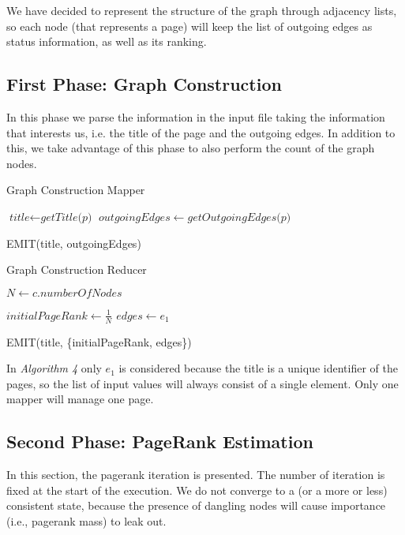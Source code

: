 \noindent We have decided to represent the structure of the graph through adjacency lists, so each node (that represents a page) will keep the list of outgoing edges as status information, as well as its ranking.

\subsection{First Phase: Graph Construction}
In this phase we parse the information in the input file taking the information that interests us, i.e. the title of the page and the outgoing edges. In addition to this, we take advantage of this phase to also perform the count of the graph nodes.

\begin{algorithm}[H]
	\caption{Graph Construction Mapper}\label{Mapper}
		\begin{algorithmic}[1]
					\State $\textit{title} \gets \textit{getTitle(p)}$
					\State $ outgoingEdges \gets \textit{getOutgoingEdges(p)}$
		
					\State EMIT(title, outgoingEdges)
			\EndProcedure
			
			
	\end{algorithmic}
\end{algorithm}

\begin{algorithm}[H]
	\caption{Graph Construction Reducer}\label{Reducer}
		\begin{algorithmic}[1]
				\State $N \gets c.numberOfNodes$
			\EndProcedure
		
					\State $\textit{initialPageRank} \gets \frac{1}{N} $
					\State $ \textit{edges} \gets e_1$
		
					\State EMIT(title, \{initialPageRank, edges\})
				
			\EndProcedure
		\end{algorithmic}
\end{algorithm}

\noindent In \textit{Algorithm 4} only $e_1$ is considered because the title is a unique identifier of the pages, so the list of input values will always consist of a single element. Only one mapper will manage one page.

\subsection{Second Phase: PageRank Estimation}
In this section, the pagerank iteration is presented.
\noindent The number of iteration is fixed at the start of the execution. We do not converge to a (or a more or less) consistent state, because the presence of dangling nodes will cause importance (i.e., pagerank mass) to leak out.

